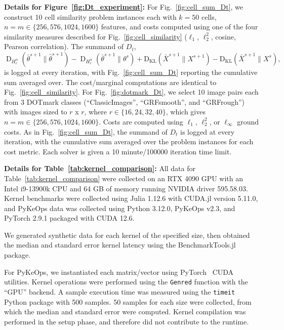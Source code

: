\documentclass[10pt]{article}
\newcommand{\DHa}{\D_{H_c^\alpha}}
\newcommand{\D}{\operatorname{D}}
\theoremstyle{plain}
\theoremstyle{definition}
\theoremstyle{remark}
\newcommand{\KL}{\mathrm{D}_\mathrm{KL}}
\begin{document}
\vspace{1em}\noindent\textbf{Details for Figure~\ref{fig:Dt_experiment}: } For Fig.~\ref{fig:cell_sum_Dt}, we construct 10 cell similarity problem instances each with $k=50$ cells, $n=m\in\{256, 576, 1024, 1600\}$ features, and costs computed using one of the four similarity measures described for Fig.~\ref{fig:cell_similarity} ($\ell_1$, $\ell_2^2$, cosine, Pearson correlation). The summand of $D_t$,
\[\DHa(\bar\theta^{s+1}\|\hat\theta^{s+1})- \DHa(\bar\theta^{s+1}\|\theta^{s})+\KL(\bar X^{s+1}\|X^{s+1})- \KL(\bar X^{s+1}\|X^{s}),\]
is logged at every iteration, with Fig.~\ref{fig:cell_sum_Dt} reporting the cumulative sum averaged over. The cost/marginal computations are identical to Fig.~\ref{fig:cell_similarity}. For Fig.~\ref{fig:dotmark_Dt}, we select 10 image pairs each from 3 DOTmark classes (``ClassicImages'', ``GRFsmooth'', and ``GRFrough'') with images sized to $r$ x $r$, where $r\in \{16, 24, 32, 40\}$, which gives $n=m\in \{256, 576, 1024, 1600\}$. Costs are computed using $\ell_1$, $\ell_2^2$, or $\ell_\infty$ ground costs. As in Fig.~\ref{fig:cell_sum_Dt}, the summand of $D_t$ is logged at every iteration, with the cumulative sum averaged over the problem instances for each cost metric. Each solver is given a 10 minute/100000 iteration time limit.

\vspace{1em}\noindent\textbf{Details for Table~\ref{tab:kernel_comparison}: }
All data for Table~\ref{tab:kernel_comparison} were collected on an RTX 4090 GPU with an Intel i9-13900k CPU and 64 GB of memory running NVIDIA driver 595.58.03. Kernel benchmarks were collected using Julia 1.12.6 with CUDA.jl version 5.11.0, and PyKeOps data was collected using Python 3.12.0, PyKeOps v2.3, and PyTorch 2.9.1 packaged with CUDA 12.6.

We generated synthetic data for each kernel of the specified size, then obtained the median and standard error kernel latency using the BenchmarkTools.jl package.

For PyKeOps, we instantiated each matrix/vector using PyTorch~\cite{paszkePyTorchImperativeStyle2019} CUDA utilities. Kernel operations were performed using the \texttt{Genred} function with the ``GPU'' backend. A sample execution time was measured using the \texttt{timeit} Python package with 500 samples. 50 samples for each size were collected, from which the median and standard error were computed. Kernel compilation was performed in the setup phase, and therefore did not contribute to the runtime.
\end{document}
